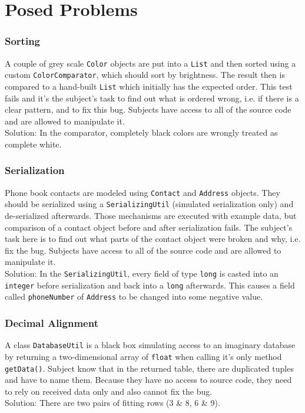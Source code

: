 \documentclass{acm_proc_article-sp}
\begin{document}
\section{Posed Problems}
\subsubsection{Sorting}
A couple of grey scale \verb.Color. objects are put into a \verb.List. and then sorted using a custom \verb.ColorComparator., which should sort by brightness. The result then is compared to a hand-built \verb.List. which initially has the expected order. This test fails and it's the subject's task to find out what is ordered wrong, i.e. if there is a clear pattern, and to fix this bug. Subjects have access to all of the source code and are allowed to manipulate it.\\
Solution: In the comparator, completely black colors are wrongly treated as complete white.

\subsubsection{Serialization}
Phone book contacts are modeled using \verb.Contact. and \verb.Address. objects. They should be serialized using a \verb.SerializingUtil. (simulated serialization only) and de-serialized afterwards.
Those mechanisms are executed with example data, but comparison of a contact object before and after serialization fails. The subject's task here is to find out what parts of the contact object were broken and why, i.e. fix the bug. Subjects have access to all of the source code and are allowed to manipulate it.\\
Solution: In the \verb.SerializingUtil., every field of type \verb.long. is casted into an \verb.integer. before serialization and back into a \verb.long. afterwards. This causes a field called \verb.phoneNumber. of \verb.Address. to be changed into some negative value.

\subsubsection{Decimal Alignment}
A class \verb.DatabaseUtil. is a black box simulating access to an imaginary database by returning a two-dimensional array of \verb.float. when calling it's only method \verb.getData().. Subject know that in the returned table, there are duplicated tuples and have to name them. Because they have no access to source code, they need to rely on received data only and also cannot fix the bug.\\
Solution: There are two pairs of fitting rows (3 \& 8, 6 \& 9).
\end{document}
